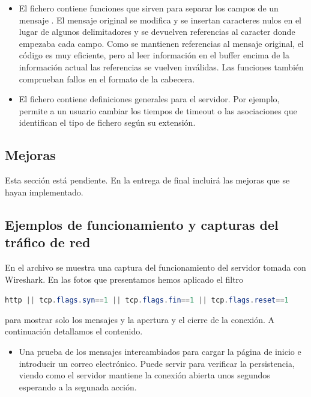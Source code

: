 {\begin{itemize}
\item El fichero  contiene funciones que sirven para separar los campos de un mensaje {\HTTP}. El mensaje original se modifica y se insertan caracteres nulos en el lugar de algunos delimitadores y se devuelven referencias al caracter donde empezaba cada campo. Como se mantienen referencias al mensaje original, el código es muy eficiente, pero al leer información en el buffer encima de la información actual las referencias se vuelven inválidas. Las funciones también comprueban fallos en el formato de la cabecera.

\item El fichero  contiene definiciones generales para el servidor. Por ejemplo, permite a un usuario cambiar los tiempos de timeout o las asociaciones  que identifican el tipo de fichero según su extensión.
\end{itemize}

\subsection{Mejoras}
Esta sección está pendiente. En la entrega de final incluirá las mejoras que se hayan implementado.


\subsection{Ejemplos de funcionamiento y capturas del tráfico de red}
En el archivo  se muestra una captura del funcionamiento del servidor tomada con Wireshark. En las fotos que presentamos hemos aplicado el filtro
\begin{center}
    \lstinline[language=java, basicstyle=\normalsize]
    {http || tcp.flags.syn==1 || tcp.flags.fin==1 || tcp.flags.reset==1}
\end{center}
para mostrar solo los mensajes {\HTTP} y la apertura y el cierre de la conexión. A continuación detallamos el contenido.

\begin{itemize}
\item [\cref{img-cap-normal}] Una prueba de los mensajes intercambiados para cargar la página de inicio e introducir un correo electrónico. Puede servir para verificar la persistencia, viendo como el servidor mantiene la conexión abierta unos segundos esperando a la segunada acción.


\end{itemize}}
